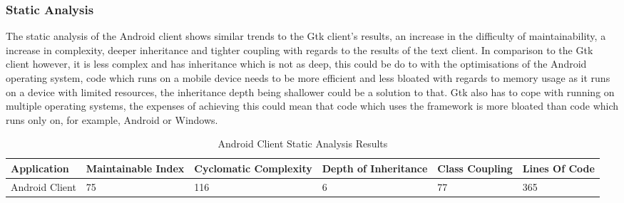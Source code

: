 \documentclass{article}
\begin{document}
\subsubsection{Static Analysis}
The static analysis of the Android client shows similar trends to the Gtk client's results, an increase in the difficulty of maintainability, a increase in complexity, deeper inheritance and tighter coupling with regards to the results of the text client. In comparison to the Gtk client however, it is less complex and has inheritance which is not as deep, this could be do to with the optimisations of the Android operating system, code which runs on a mobile device needs to be more efficient and less bloated with regards to memory usage as it runs on a device with limited resources, the inheritance depth being shallower could be a solution to that. Gtk also has to cope with running on multiple operating systems, the expenses of achieving this could mean that code which uses the framework is more bloated than code which runs only on, for example, Android or Windows.
\begin{table}[H]
	\centering
	\caption{Android Client Static Analysis Results}
	\label{my-label}
	\begin{tabularx}{\textwidth}{|X|X|X|X|X|X|}
		\hline
		\textbf{Application} & \textbf{Maintainable Index} & \textbf{Cyclomatic Complexity} & \textbf{Depth of Inheritance} & \textbf{Class Coupling} & \textbf{Lines Of Code} \\ \hline
		Android Client & 75 &  116         &   6        &    77       &     365      \\ \hline
	\end{tabularx}
\end{table}
\end{document}

